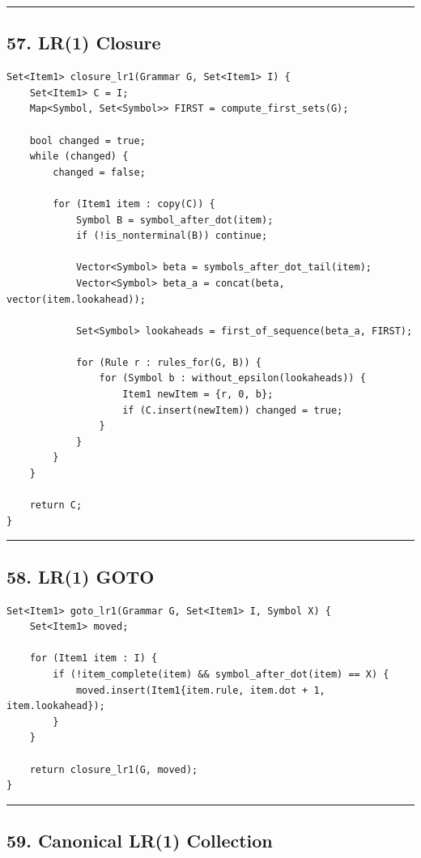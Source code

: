 \documentclass[10pt,letterpaper]{article}
\begin{document}
\medskip\hrule\medskip

\subsection*{57. LR(1) Closure}

\begin{verbatim}
Set<Item1> closure_lr1(Grammar G, Set<Item1> I) {
    Set<Item1> C = I;
    Map<Symbol, Set<Symbol>> FIRST = compute_first_sets(G);

    bool changed = true;
    while (changed) {
        changed = false;

        for (Item1 item : copy(C)) {
            Symbol B = symbol_after_dot(item);
            if (!is_nonterminal(B)) continue;

            Vector<Symbol> beta = symbols_after_dot_tail(item);
            Vector<Symbol> beta_a = concat(beta, vector(item.lookahead));

            Set<Symbol> lookaheads = first_of_sequence(beta_a, FIRST);

            for (Rule r : rules_for(G, B)) {
                for (Symbol b : without_epsilon(lookaheads)) {
                    Item1 newItem = {r, 0, b};
                    if (C.insert(newItem)) changed = true;
                }
            }
        }
    }

    return C;
}
\end{verbatim}

\medskip\hrule\medskip

\subsection*{58. LR(1) GOTO}

\begin{verbatim}
Set<Item1> goto_lr1(Grammar G, Set<Item1> I, Symbol X) {
    Set<Item1> moved;

    for (Item1 item : I) {
        if (!item_complete(item) && symbol_after_dot(item) == X) {
            moved.insert(Item1{item.rule, item.dot + 1, item.lookahead});
        }
    }

    return closure_lr1(G, moved);
}
\end{verbatim}

\medskip\hrule\medskip

\subsection*{59. Canonical LR(1) Collection}
\end{document}
